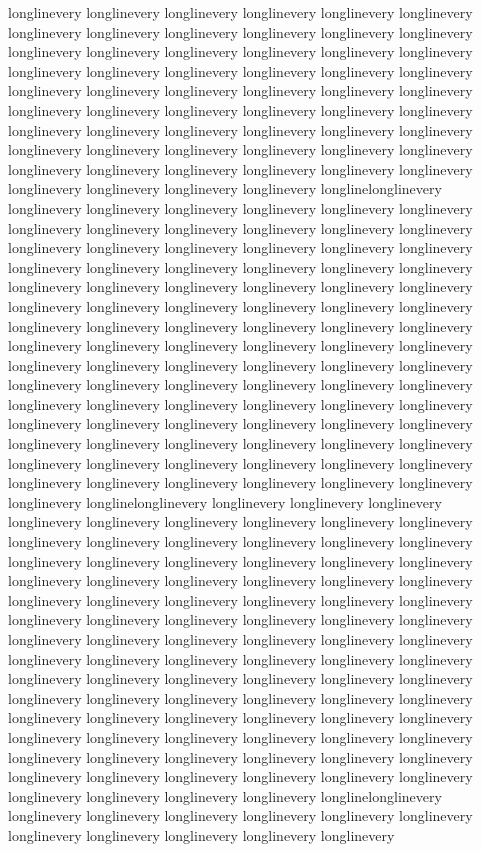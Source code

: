 {longlinevery longlinevery longlinevery longlinevery longlinevery longlinevery longlinevery longlinevery longlinevery longlinevery longlinevery longlinevery longlinevery longlinevery longlinevery longlinevery longlinevery longlinevery longlinevery longlinevery longlinevery longlinevery longlinevery longlinevery longlinevery longlinevery longlinevery longlinevery longlinevery longlinevery longlinevery longlinevery longlinevery longlinevery longlinevery longlinevery longlinevery longlinevery longlinevery longlinevery longlinevery longlinevery longlinevery longlinevery longlinevery longlinevery longlinevery longlinevery longlinevery longlinevery longlinevery longlinevery longlinevery longlinevery longlinevery longlinevery longlinevery longlinevery longlinelonglinevery longlinevery longlinevery longlinevery longlinevery longlinevery longlinevery longlinevery longlinevery longlinevery longlinevery longlinevery longlinevery longlinevery longlinevery longlinevery longlinevery longlinevery longlinevery longlinevery longlinevery longlinevery longlinevery longlinevery longlinevery longlinevery longlinevery longlinevery longlinevery longlinevery longlinevery longlinevery longlinevery longlinevery longlinevery longlinevery longlinevery longlinevery longlinevery longlinevery longlinevery longlinevery longlinevery longlinevery longlinevery longlinevery longlinevery longlinevery longlinevery longlinevery longlinevery longlinevery longlinevery longlinevery longlinevery longlinevery longlinevery longlinevery longlinevery longlinevery longlinevery longlinevery longlinevery longlinevery longlinevery longlinevery longlinevery longlinevery longlinevery longlinevery longlinevery longlinevery longlinevery longlinevery longlinevery longlinevery longlinevery longlinevery longlinevery longlinevery longlinevery longlinevery longlinevery longlinevery longlinevery longlinevery longlinevery longlinevery longlinevery longlinevery longlinevery longlinevery longlinelonglinevery longlinevery longlinevery longlinevery longlinevery longlinevery longlinevery longlinevery longlinevery longlinevery longlinevery longlinevery longlinevery longlinevery longlinevery longlinevery longlinevery longlinevery longlinevery longlinevery longlinevery longlinevery longlinevery longlinevery longlinevery longlinevery longlinevery longlinevery longlinevery longlinevery longlinevery longlinevery longlinevery longlinevery longlinevery longlinevery longlinevery longlinevery longlinevery longlinevery longlinevery longlinevery longlinevery longlinevery longlinevery longlinevery longlinevery longlinevery longlinevery longlinevery longlinevery longlinevery longlinevery longlinevery longlinevery longlinevery longlinevery longlinevery longlinevery longlinevery longlinevery longlinevery longlinevery longlinevery longlinevery longlinevery longlinevery longlinevery longlinevery longlinevery longlinevery longlinevery longlinevery longlinevery longlinevery longlinevery longlinevery longlinevery longlinevery longlinevery longlinevery longlinevery longlinevery longlinevery longlinevery longlinevery longlinevery longlinevery longlinevery longlinevery longlinevery longlinevery longlinelonglinevery longlinevery longlinevery longlinevery longlinevery longlinevery longlinevery longlinevery longlinevery longlinevery longlinevery longlinevery }
